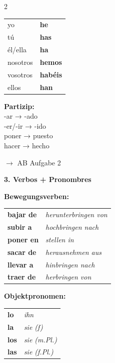 \documentclass[11pt, a4paper]{article}
\newcommand{\seriftext}[1]{{\fontfamily{ppl}\selectfont #1}}
\newcommand{\es}[1]{\seriftext{\textbf{#1}}}
\newcommand{\de}[1]{\textit{\textcolor{akzent}{#1}}}
\newcommand{\abmark}[1]{{\footnotesize\textcolor{akzent}{$\rightarrow$ AB #1}}}
\newcommand{\abschnitt}[2]{\noindent\textbf{\large #1. #2}}
\newcommand{\stamm}[1]{\textcolor{colorrojo}{#1}}
\begin{document}
\begin{multicols}{2}
\begin{grammatikbox}
\vspace{3pt}

{\footnotesize
\begin{tabular}{@{}ll@{}}
yo & \es{he} \\
tú & \es{has} \\
él/ella & \es{ha} \\
nosotros & \es{hemos} \\
vosotros & \es{habéis} \\
ellos & \es{han} \\
\end{tabular}}

\vspace{4pt}

{\footnotesize
\textbf{Partizip:}\\
-ar → \stamm{-ado}\\
-er/-ir → \stamm{-ido}\\
poner → \stamm{puesto}\\
hacer → \stamm{hecho}
}
\end{grammatikbox}

\abmark{Aufgabe 2}

\columnbreak

\abschnitt{3}{Verbos + Pronombres}

\vspace{4pt}

\textbf{Bewegungsverben:}

\begin{grammatikbox}
{\footnotesize
\begin{tabular}{@{}ll@{}}
\es{bajar de} & \de{herunterbringen von} \\
\es{subir a} & \de{hochbringen nach} \\
\es{poner en} & \de{stellen in} \\
\es{sacar de} & \de{herausnehmen aus} \\
\es{llevar a} & \de{hinbringen nach} \\
\es{traer de} & \de{herbringen von} \\
\end{tabular}}
\end{grammatikbox}

\textbf{Objektpronomen:}

\begin{grammatikbox}
{\footnotesize
\begin{tabular}{@{}ll@{}}
\es{lo} & \de{ihn} \\
\es{la} & \de{sie (f)} \\
\es{los} & \de{sie (m.Pl.)} \\
\es{las} & \de{sie (f.Pl.)} \\
\end{tabular}}


\end{grammatikbox}
\end{multicols}
\end{document}
